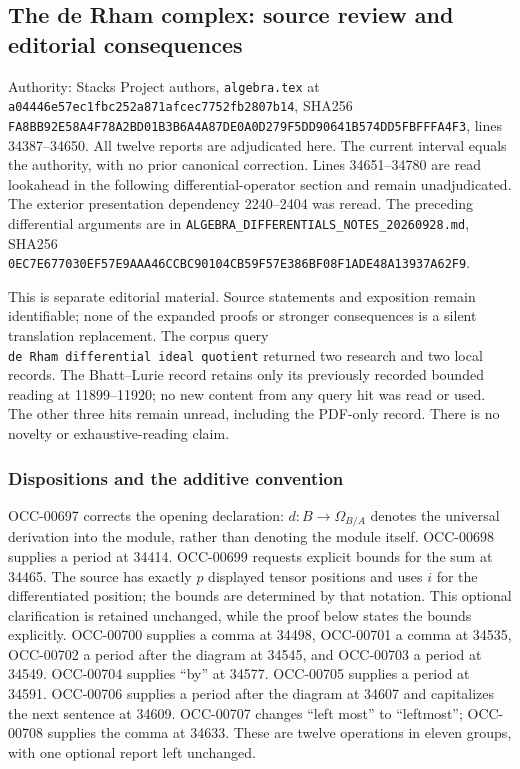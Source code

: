\subsection{The de Rham complex: source review and editorial consequences}\label{the-de-rham-complex-source-review-and-editorial-consequences}

Authority: Stacks Project authors, \texttt{algebra.tex} at \texttt{a04446e57ec1fbc252a871afcec7752fb2807b14}, SHA256 \texttt{FA8BB92E58A4F78A2BD01B3B6A4A87DE0A0D279F5DD90641B574DD5FBFFFA4F3}, lines 34387--34650. All twelve reports are adjudicated here. The current interval equals the authority, with no prior canonical correction. Lines 34651--34780 are read lookahead in the following differential-operator section and remain unadjudicated. The exterior presentation dependency 2240--2404 was reread. The preceding differential arguments are in \texttt{ALGEBRA\_DIFFERENTIALS\_NOTES\_20260928.md}, SHA256 \texttt{0EC7E677030EF57E9AAA46CCBC90104CB59F57E386BF08F1ADE48A13937A62F9}.

This is separate editorial material. Source statements and exposition remain identifiable; none of the expanded proofs or stronger consequences is a silent translation replacement. The corpus query \texttt{de\ Rham\ differential\ ideal\ quotient} returned two research and two local records. The Bhatt--Lurie record retains only its previously recorded bounded reading at 11899--11920; no new content from any query hit was read or used. The other three hits remain unread, including the PDF-only record. There is no novelty or exhaustive-reading claim.

\subsubsection{Dispositions and the additive convention}\label{dispositions-and-the-additive-convention}

OCC-00697 corrects the opening declaration: \(d:B\to\Omega_{B/A}\) denotes the universal derivation into the module, rather than denoting the module itself. OCC-00698 supplies a period at 34414. OCC-00699 requests explicit bounds for the sum at 34465. The source has exactly \(p\) displayed tensor positions and uses \(i\) for the differentiated position; the bounds are determined by that notation. This optional clarification is retained unchanged, while the proof below states the bounds explicitly. OCC-00700 supplies a comma at 34498, OCC-00701 a comma at 34535, OCC-00702 a period after the diagram at 34545, and OCC-00703 a period at 34549. OCC-00704 supplies ``by'' at 34577. OCC-00705 supplies a period at 34591. OCC-00706 supplies a period after the diagram at 34607 and capitalizes the next sentence at 34609. OCC-00707 changes ``left most'' to ``leftmost''; OCC-00708 supplies the comma at 34633. These are twelve operations in eleven groups, with one optional report left unchanged.

